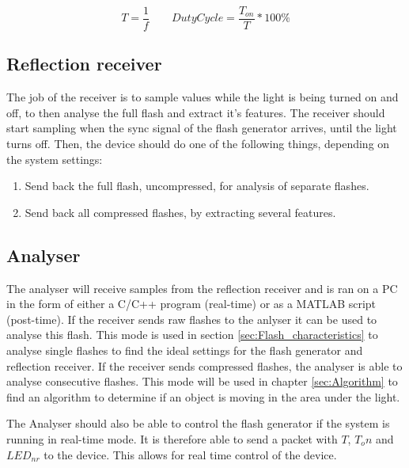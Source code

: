 \begin{equation}
\label{eq:1/f=T}
T=\frac{1}{f}
\qquad
DutyCycle=\frac{T_{on}}{T} * 100\%
\end{equation}


\subsection{Reflection receiver}
The job of the receiver is to sample values while the light is being turned on and off, to then analyse the full flash and extract it's features. The receiver should start sampling when the sync signal of the flash generator arrives, until the light turns off. Then, the device should do one of the following things, depending on the system settings:
\begin{enumerate}
	\item Send back the full flash, uncompressed, for analysis of separate flashes.
	\item Send back all compressed flashes, by extracting several features.
\end{enumerate}

\subsection{Analyser}
The analyser will receive samples from the reflection receiver and is ran on a PC in the form of either a C/C++ program (real-time) or as a MATLAB script (post-time). If the receiver sends raw flashes to the anlyser it can be used to analyse this flash. This mode is used in section \ref{sec:Flash_characteristics} to analyse single flashes to find the ideal settings for the flash generator and reflection receiver. If the receiver sends compressed flashes, the analyser is able to analyse consecutive flashes. This mode will be used in chapter \ref{sec:Algorithm} to find an algorithm to determine if an object is moving in the area under the light.

The Analyser should also be able to control the flash generator if the system is running in real-time mode. It is therefore able to send a packet with $T$, ${T_on}$ and $LED_{nr}$ to the device. This allows for real time control of the device.

